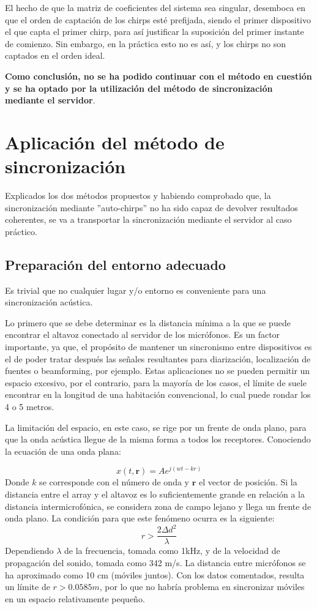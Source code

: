 \documentclass[a4paper,11pt]{book}
\begin{document}
El hecho de que la matriz de coeficientes del sistema sea singular, desemboca en que el orden de captación de los chirps esté prefijada, siendo el primer dispositivo el que capta el primer chirp, para así justificar la suposición del primer instante de comienzo. Sin embargo, en la práctica esto no es así, y los chirps no son captados en el orden ideal.

\textbf{Como conclusión, no se ha podido continuar con el método en cuestión y se ha optado por la utilización del método de sincronización mediante el servidor}.


\section{Aplicación del método de sincronización}

Explicados los dos métodos propuestos y habiendo comprobado que, la sincronización mediante ''auto-chirps'' no ha sido capaz de devolver resultados coherentes, se va a transportar la sincronización mediante el servidor al caso práctico.

\subsection{Preparación del entorno adecuado}
Es trivial que no cualquier lugar y/o entorno es conveniente para una sincronización acústica.

 Lo primero que se debe determinar es la distancia mínima a la que se puede encontrar el altavoz conectado al servidor de los micrófonos. Es un factor importante, ya que, el propósito de mantener un sincronismo entre dispositivos es el de poder tratar después las señales resultantes para diarización, localización de fuentes o beamforming, por ejemplo. Estas aplicaciones no se pueden permitir un espacio excesivo, por el contrario, para la mayoría de los casos, el límite de suele encontrar en la longitud de una habitación convencional, lo cual puede rondar los 4 o 5 metros.

La limitación del espacio, en este caso, se rige por un frente de onda plano, para que la onda acústica llegue de la misma forma a todos los receptores. Conociendo la ecuación de una onda plana:

\begin{equation}
x(t, \textbf{r}) = Ae^{j(wt - kr)}
\end{equation}
Donde $k$ se corresponde con el número de onda y $\textbf{r}$ el vector de posición. Si la distancia entre el array y el altavoz es lo suficientemente grande en relación a la distancia intermicrofónica, se considera zona de campo lejano y llega un frente de onda plano. La condición para que este fenómeno ocurra es la siguiente:
\begin{equation}
r > \frac{2 \Delta d ^ {2}}{\lambda}
\end{equation}
Dependiendo $\lambda$ de la frecuencia, tomada como 1kHz, y de la velocidad de propagación del sonido, tomada como 342 m/s. La distancia entre micrófonos se ha aproximado como 10 cm (móviles juntos). Con los datos comentados, resulta un límite de $r > 0.0585 m$, por lo que no habría problema en sincronizar móviles en un espacio relativamente pequeño.
\end{document}
